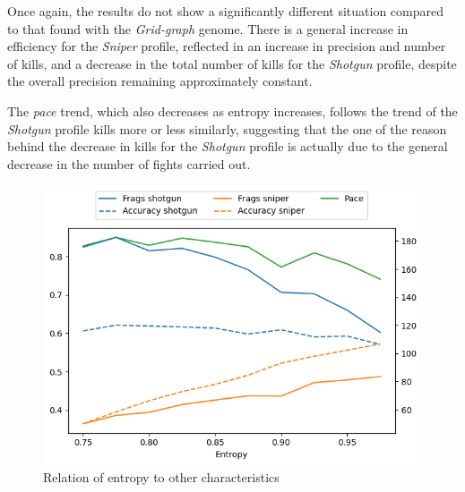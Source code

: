 Once again, the results do not show a significantly different situation compared to that found with the \textit{Grid-graph} genome. 
There is a general increase in efficiency for the \textit{Sniper} profile, reflected in an increase in precision and number of kills, and a decrease in the total number of kills for the \textit{Shotgun} profile, despite the overall precision remaining approximately constant. 

The \textit{pace} trend, which also decreases as entropy increases, follows the trend of the \textit{Shotgun} profile kills more or less similarly, suggesting that the one of the reason behind the decrease in kills for the \textit{Shotgun} profile is actually due to the general decrease in the number of fights carried out.

\begin{figure}[H]
\centering
\includegraphics[width=0.6\linewidth]{Images/images/experiment_two/entropy_mix.png}
\caption{Relation of entropy to other characteristics}
\label{fig:ex_two_entropy_relations}
\end{figure}


\newpage


